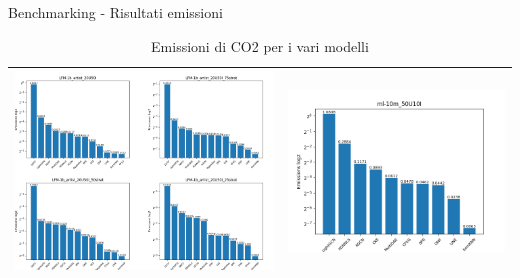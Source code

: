 \begin{frame}{Benchmarking - Risultati emissioni}
    \begin{table}[H]
        \centering
        \footnotesize
        \setlength\tabcolsep{0pt}
        \begin{tabularx}{\textwidth}{|X|X|}
            \hline
            \includegraphics[width=\linewidth, trim=0 0 0 0]{images/EmissioniLFM.png} & 
            \includegraphics[width=\linewidth, trim=0 0 0 0]{images/emissions_ml-10m_50U10I.png} \\
            \hline
        \end{tabularx}
        \caption{Emissioni di CO2 per i vari modelli}
    \end{table}
\end{frame}


